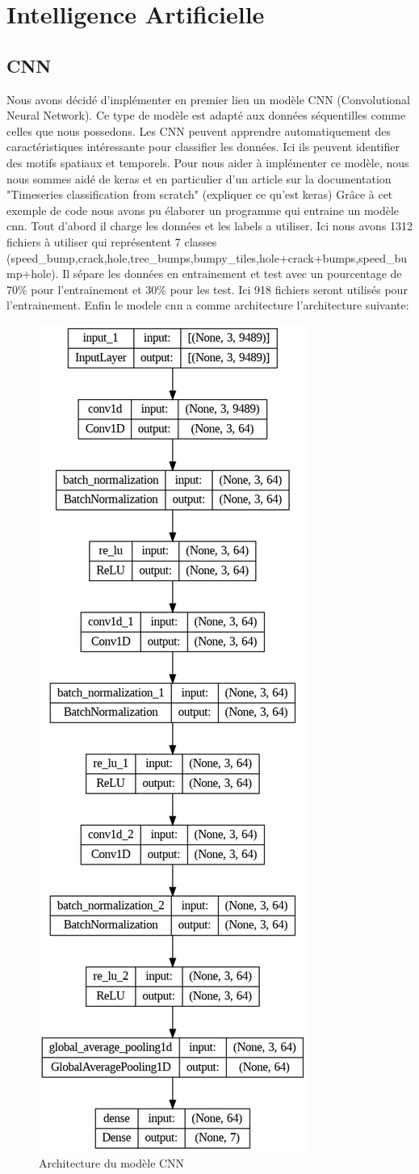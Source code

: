 \section{Intelligence Artificielle}

\subsection{CNN}

 Nous avons décidé d'implémenter en premier lieu un modèle CNN (Convolutional Neural Network). Ce type de modèle est adapté aux données séquentilles comme celles que nous possedons. Les CNN peuvent apprendre automatiquement des caractéristiques intéressante pour classifier les données. Ici ils peuvent identifier des motifs spatiaux et temporels. Pour nous aider à implémenter ce modèle, nous nous sommes aidé de keras et en particulier d'un article sur la documentation "Timeseries classification from scratch" \cite{keras} (expliquer ce qu'est keras) Grâce à cet exemple de code nous avons pu élaborer un programme qui entraine un modèle cnn. Tout d'abord il charge les données et les labels a utiliser. Ici nous avons 1312 fichiers à utiliser qui représentent 7 classes (speed\_bump,crack,hole,tree\_bumps,bumpy\_tiles,hole+crack+bumps,speed\_bump+hole). Il sépare les données en entrainement et test avec un pourcentage de 70\% pour l'entrainement et 30\% pour les test. Ici 918 fichiers seront utilisés pour l'entrainement. Enfin le modele cnn a comme architecture l'architecture suivante:
 \begin{figure}[H]
     \centering
     \includegraphics[width=0.4\linewidth]{cnn_pi.png}
     \caption{Architecture du modèle CNN}
     \label{cnn}
 \end{figure}
